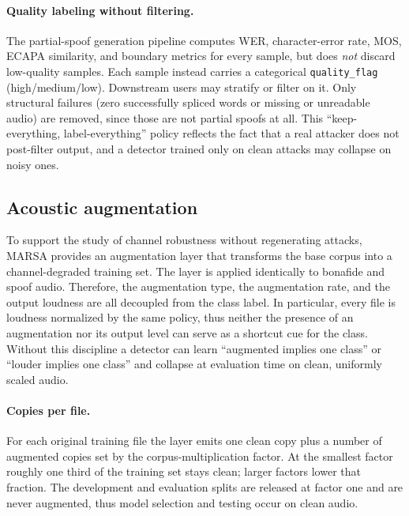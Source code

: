 \documentclass[11pt]{article}
\begin{document}
\paragraph{Quality labeling without filtering.} The partial-spoof
generation pipeline computes WER, character-error rate, MOS, ECAPA similarity, and
boundary metrics for every sample, but does \emph{not} discard
low-quality samples. Each sample instead carries a categorical
\texttt{quality\_flag} (high/medium/low). Downstream users may stratify
or filter on it. Only structural failures (zero successfully spliced
words or missing or unreadable audio) are removed, since those are
not partial spoofs at all. This ``keep-everything, label-everything''
policy
reflects the fact that a real attacker does not post-filter output, and a
detector trained only on clean attacks may collapse on noisy ones.


\subsection*{Acoustic augmentation}

To support the study of channel robustness without regenerating
attacks, MARSA provides an augmentation layer that transforms the base
corpus into a channel-degraded training set. The layer is applied
identically to bonafide and spoof audio. Therefore, the augmentation type, the augmentation rate, and
the output loudness are all decoupled from the class label. In particular,
every file is loudness normalized by the same policy, thus neither the presence of an
augmentation nor its output level can serve as a shortcut cue for the
class. Without this discipline a detector can learn ``augmented implies
one class'' or ``louder implies one class'' and collapse at evaluation
time on clean, uniformly scaled audio.

\paragraph{Copies per file.} For each original training file the layer
emits one clean copy plus a number of augmented copies set by the 
corpus-multiplication factor. At the smallest factor
roughly one third of the training set stays clean; larger factors lower
that fraction. The development and evaluation splits are released at
factor one and are never augmented, thus model selection and testing
occur on clean audio.
\end{document}
